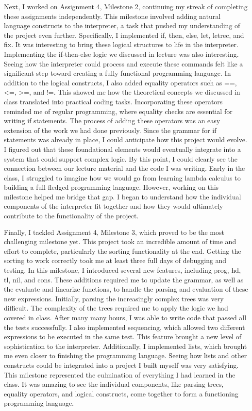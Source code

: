 \documentclass{article}
\theoremstyle{plain}
\theoremstyle{definition}
\theoremstyle{remark}
\begin{document}
Next, I worked on Assignment 4, Milestone 2, continuing my streak of completing these assignments independently. This milestone involved adding natural language constructs to the interpreter, a task that pushed my understanding of the project even further. Specifically, I implemented if, then, else, let, letrec, and fix. It was interesting to bring these logical structures to life in the interpreter. Implementing the if-then-else logic we discussed in lecture was also interesting. Seeing how the interpreter could process and execute these commands felt like a significant step toward creating a fully functional programming language. In addition to the logical constructs, I also added equality operators such as ==, <=, >=, and !=. This showed me how the theoretical concepts we discussed in class translated into practical coding tasks. Incorporating these operators reminded me of regular programming, where equality checks are essential for writing if statements. The process of adding these operators was an easy extension of the work we had done previously. Since the grammar for if statements was already in place, I could anticipate how this project would evolve. I figured out that these foundational elements would eventually integrate into a system that could support complex logic. By this point, I could clearly see the connection between our lecture material and the code I was writing. Early in the class, I struggled to imagine how we would go from learning lambda calculus to building a full-fledged programming language. However, working on this milestone helped me bridge that gap. I began to understand how the individual components of the interpreter fit together and how they would ultimately contribute to the functionality of the project. 


Finally, I tackled Assignment 4, Milestone 3, which proved to be the most challenging milestone yet. This project took an incredible amount of time and effort to complete, particularly the sorting functionality at the end. Getting the sorting to work correctly took me at least three full days of debugging and testing. In this milestone, I introduced several new features, including prog, hd, tl, nil, and cons. These additions required me to update the grammar, as well as the evaluate and linearize functions, to handle the parsing and evaluation of these new expressions. Initially, parsing the increasingly complex trees was very difficult. The complexity of the trees required me to apply the logic we had covered in class. After many many hours, I was able to write code that passed all the tests successfully. I also implemented sequencing, which allowed two different expressions to be executed in the same test. This feature brought a new level of sophistication to the interpreter. Additionally, I implemented lists, which brought me even closer to finishing the programming language. Seeing how lists and other constructs could be integrated into a project I built myself was very satisfying. This milestone represented the culmination of everything I had learned in the class. It was amazing to see the individual components, like parsing trees, equality operators, and logical constructs, come together to form a functioning programming language.
\end{document}
